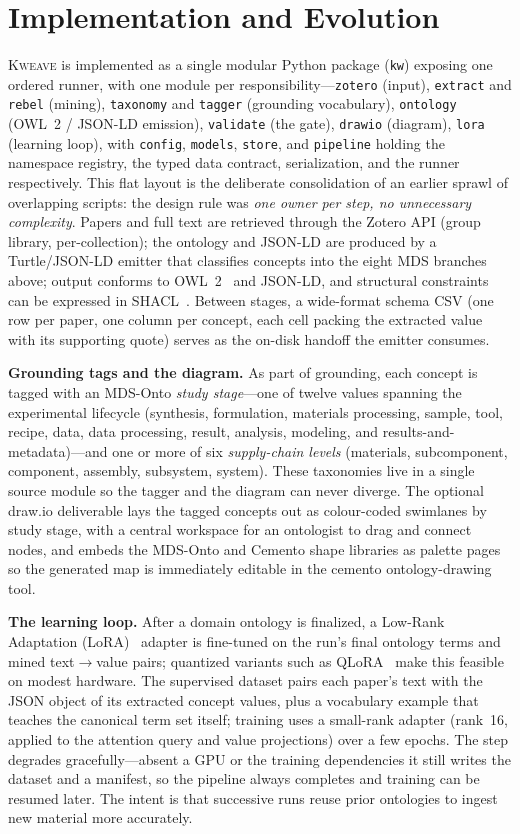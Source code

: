 \documentclass[Afour,sageh,times]{sagej}
\begin{document}
\section{Implementation and Evolution}
\textsc{Kweave} is implemented as a single modular Python package (\texttt{kw}) exposing one ordered
runner, with one module per responsibility---\texttt{zotero} (input), \texttt{extract} and
\texttt{rebel} (mining), \texttt{taxonomy} and \texttt{tagger} (grounding vocabulary), \texttt{ontology}
(OWL~2 / JSON-LD emission), \texttt{validate} (the gate), \texttt{drawio} (diagram), \texttt{lora}
(learning loop), with \texttt{config}, \texttt{models}, \texttt{store}, and \texttt{pipeline} holding
the namespace registry, the typed data contract, serialization, and the runner respectively. This flat
layout is the deliberate consolidation of an earlier sprawl of overlapping scripts: the design rule was
\emph{one owner per step, no unnecessary complexity}. Papers and full text are retrieved through the
Zotero API (group library, per-collection); the ontology and JSON-LD are produced by a Turtle/JSON-LD
emitter that classifies concepts into the eight MDS branches above; output conforms to
OWL~2~\cite{owl2} and JSON-LD, and structural constraints can be expressed in SHACL~\cite{shacl}.
Between stages, a wide-format schema CSV (one row per paper, one column per concept, each cell packing
the extracted value with its supporting quote) serves as the on-disk handoff the emitter consumes.

\textbf{Grounding tags and the diagram.} As part of grounding, each concept is tagged with an MDS-Onto
\emph{study stage}---one of twelve values spanning the experimental lifecycle (synthesis, formulation,
materials processing, sample, tool, recipe, data, data processing, result, analysis, modeling, and
results-and-metadata)---and one or more of six \emph{supply-chain levels} (materials, subcomponent,
component, assembly, subsystem, system). These taxonomies live in a single source module so the tagger
and the diagram can never diverge. The optional draw.io deliverable lays the tagged concepts out as
colour-coded swimlanes by study stage, with a central workspace for an ontologist to drag and connect
nodes, and embeds the MDS-Onto and Cemento shape libraries as palette pages so the generated map is
immediately editable in the cemento ontology-drawing tool.

\textbf{The learning loop.} After a domain ontology is finalized, a Low-Rank Adaptation
(LoRA)~\cite{hu2021lora} adapter is fine-tuned on the run's final ontology terms and mined
text$\rightarrow$value pairs; quantized variants such as QLoRA~\cite{dettmers2023qlora} make this
feasible on modest hardware. The supervised dataset pairs each paper's text with the JSON object of its
extracted concept values, plus a vocabulary example that teaches the canonical term set itself; training
uses a small-rank adapter (rank~16, applied to the attention query and value projections) over a few
epochs. The step degrades gracefully---absent a GPU or the training dependencies it still writes the
dataset and a manifest, so the pipeline always completes and training can be resumed later. The intent
is that successive runs reuse prior ontologies to ingest new material more accurately.
\end{document}
